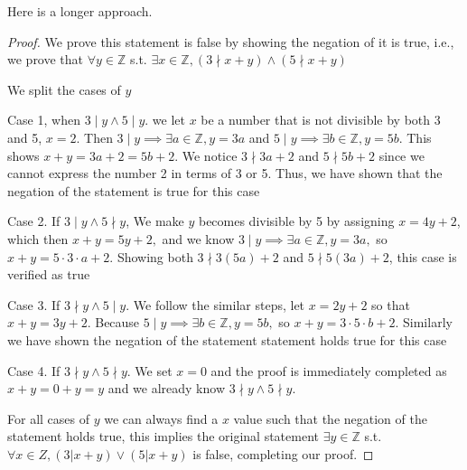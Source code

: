 \documentclass{homework}
\begin{document}
Here is a longer approach. 

\begin{proof}
    We prove this statement is false by showing the negation of it is true, i.e., we prove that $\forall y \in\mathbb{Z}$ s.t. $\exists x\in\mathbb{Z}, (3\nmid x+y)\land(5\nmid x+y)$
    
    We split the cases of $y$
    
    Case 1, when $3\mid y \land 5\mid y$. we let $x$ be a number that is not divisible by both 3 and 5, $x=2$. Then $3\mid y\implies \exists a\in\mathbb{Z},y=3a$ and $5\mid y\implies \exists b\in\mathbb{Z},y=5b.$ This shows $x+y=3a+2=5b+2$. We notice $3\nmid 3a+2$ and $5\nmid 5b+2$ since we cannot express the number 2 in terms of 3 or 5. Thus, we have shown that the negation of the statement is true for this case
    
    Case 2. If  $3\mid y\land 5\nmid y$, We make $y$ becomes divisible by 5 by assigning $x=4y+2$, which then $x+y=5y+2,$ and we know $3\mid y\implies \exists a\in\mathbb{Z},y=3a,$ so $x+y=5\cdot3\cdot a+2$. Showing both $3\nmid 3(5a)+2$ and $5\nmid 5(3a)+2$, this case is verified as true
    
    Case 3. If $3\nmid y \land 5\mid y.$ We follow the similar steps, let $x=2y+2$ so that $x+y=3y+2$. Because $5\mid y\implies \exists b\in\mathbb{Z},y=5b,$ so $x+y=3\cdot5\cdot b+2$. Similarly we have shown the negation of the statement statement holds true for this case
    
    Case 4. If $3\nmid y \land 5\nmid y$. We set $x=0$ and the proof is immediately completed as $x+y=0+y=y$ and we already know $3\nmid y \land 5\nmid y$.
    
    For all cases of $y$ we can always find a $x$ value such that the negation of the statement holds true, this implies the original statement $\exists y\in\mathbb{Z}$ s.t. $\forall x ∈ Z,(3|x+y)\lor(5|x+y)$ is false, completing our proof.
 \end{proof}
\end{document}
